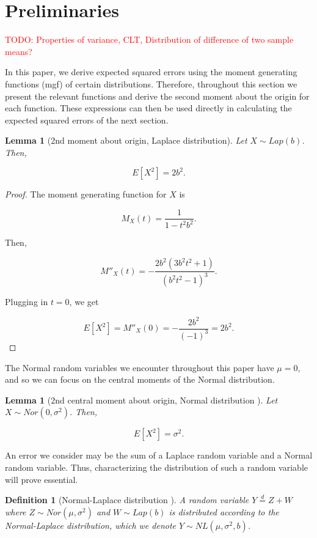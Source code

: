 \documentclass{article}
\newcommand{\todo}[1]{\textcolor{red}{TODO: {#1}}}
\theoremstyle{plain}
\newtheorem{lem}[thm]{Lemma}
\newtheorem{defn}[thm]{Definition}
\begin{document}
\section{Preliminaries}

\todo{Properties of variance, CLT, Distribution of difference of two sample means?}

In this paper, we derive expected squared errors using the moment generating functions (mgf) of certain distributions. Therefore, throughout this section we present the relevant functions and derive the second moment about the origin for each function. These expressions can then be used directly in calculating the expected squared errors of the next section. 

\begin{lem}[2nd moment about origin, Laplace distribution]
Let $X \sim Lap(b)$. Then, 

$$E[X^2] = 2b^2.$$
\end{lem}

\begin{proof}
The moment generating function for $X$ is 

$$M_X(t) = \frac{1}{1 - t^2b^2}.$$

Then,

$$M''_X(t) = -\frac{2b^2(3b^2t^2 + 1)}{(b^2t^2 - 1)^3}.$$

Plugging in $t = 0$, we get 

$$E[X^2] = M''_X(0) = -\frac{2b^2}{(-1)^3} = 2b^2.$$
\end{proof}

The Normal random variables we encounter throughout this paper have $\mu = 0$, and so we can focus on the central moments of the Normal distribution.

\begin{lem}[2nd central moment about origin, Normal distribution \cite{papoulis2002probability}]
Let $X \sim Nor(0, \sigma^2)$. Then,

$$E[X^2] = \sigma^2.$$
\end{lem}

An error we consider may be the sum of a Laplace random variable and a Normal random variable. Thus, characterizing the distribution of such a random variable will prove essential.

\begin{defn}[Normal-Laplace distribution \cite{Reed2006}]
A random variable $Y \overset{d}{=} Z + W$ where $Z \sim Nor(\mu, \sigma^2)$ and $W \sim Lap(b)$ is distributed according to the Normal-Laplace distribution, which we denote $Y \sim NL(\mu, \sigma^2, b)$.
\end{defn}
\end{document}
